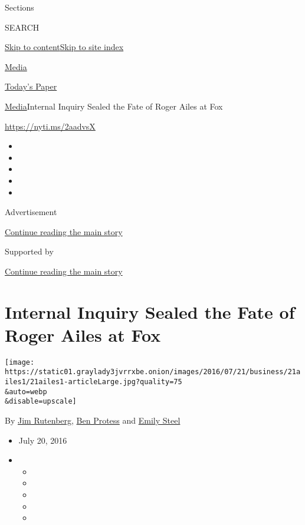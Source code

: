 Sections

SEARCH

\protect\hyperlink{site-content}{Skip to
content}\protect\hyperlink{site-index}{Skip to site index}

\href{https://www.nytimes3xbfgragh.onion/pages/business/media/index.html}{Media}

\href{https://myaccount.nytimes3xbfgragh.onion/auth/login?response_type=cookie\&client_id=vi}{}

\href{https://www.nytimes3xbfgragh.onion/section/todayspaper}{Today's
Paper}

\href{/pages/business/media/index.html}{Media}\textbar{}Internal Inquiry
Sealed the Fate of Roger Ailes at Fox

\url{https://nyti.ms/2aadvsX}

\begin{itemize}
\item
\item
\item
\item
\item
\end{itemize}

Advertisement

\protect\hyperlink{after-top}{Continue reading the main story}

Supported by

\protect\hyperlink{after-sponsor}{Continue reading the main story}

\hypertarget{internal-inquiry-sealed-the-fate-of-roger-ailes-at-fox}{%
\section{Internal Inquiry Sealed the Fate of Roger Ailes at
Fox}\label{internal-inquiry-sealed-the-fate-of-roger-ailes-at-fox}}

\texttt{[image: https://static01.graylady3jvrrxbe.onion/images/2016/07/21/business/21ailes1/21ailes1-articleLarge.jpg?quality=75\\\&auto=webp\\\&disable=upscale]}

By \href{http://www.nytimes3xbfgragh.onion/by/jim-rutenberg}{Jim
Rutenberg}, \href{http://www.nytimes3xbfgragh.onion/by/ben-protess}{Ben
Protess} and
\href{https://www.nytimes3xbfgragh.onion/by/emily-steel}{Emily Steel}

\begin{itemize}
\item
  July 20, 2016
\item
  \begin{itemize}
  \item
  \item
  \item
  \item
  \item
  \end{itemize}
\end{itemize}

